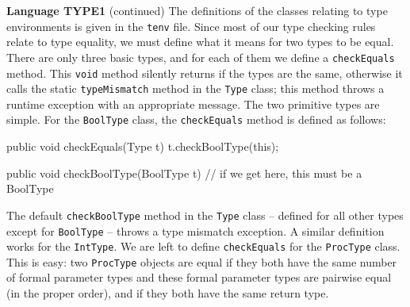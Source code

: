 \begin{minipage}[t]{\sw}
\slidenumber
\LARGE
{\bf Language TYPE1} (continued)\exx
\Large
The definitions of the classes relating to type environments
is given in the \verb'tenv' file.\exx
Since most of our type checking rules relate to type equality,
we must define what it means for two types to be equal.
There are only three basic types,
and for each of them we define a \verb'checkEquals' method.
This \verb'void' method silently returns
if the types are the same,
otherwise it calls the static \verb'typeMismatch' method
in the \verb'Type' class;
this method throws a runtime exception
with an appropriate message.\exx
The two primitive types are simple.  For the \verb'BoolType' class,
the \verb'checkEquals' method is defined as follows:
\large
\begin{qv}
public void checkEquals(Type t) {
    t.checkBoolType(this);
}

public void checkBoolType(BoolType t) {
    // if we get here, this must be a BoolType
}
\end{qv}
\Large
The default \verb'checkBoolType' method in the \verb'Type' class --
defined for all other types except for \verb'BoolType' --
throws a type mismatch exception.\exx
A similar definition works for the \verb'IntType'.\exx
We are left to define \verb'checkEquals' for the \verb'ProcType' class.
This is easy: two \verb'ProcType' objects are equal
if they both have the same number of formal parameter types
and these formal parameter types are pairwise equal (in the proper order),
and if they both have the same return type.
\end{minipage}

